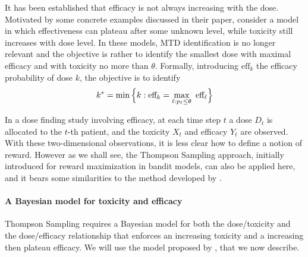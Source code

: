 It has been established that efficacy is not always increasing with the dose. Motivated by some concrete examples discussed in their paper, \cite{MKR17} consider a model in which effectiveness can plateau after some unknown level, while toxicity still increases with dose level. In these models, MTD identification is no longer relevant and the objective is rather to identify the smallest dose with maximal efficacy and with toxicity no more than $\theta$. Formally, introducing $\text{eff}_k$ the efficacy probability of dose $k$, the objective is to identify
\[k^* = \min\Big\{ k : \eff_k = \max_{\ell : p_\ell \leq \theta} \ \text{eff}_\ell\Big\}  \]

In a dose finding study involving efficacy, at each time step $t$ a dose $D_t$ is allocated to the $t$-th patient, and the toxicity $X_t$ and efficacy $Y_t$ are observed. With these two-dimensional observations, it is less clear how to define a notion of reward. However as we shall see, the Thompson Sampling approach, initially introduced for reward maximization in bandit models, can also be applied here, and it bears some similarities to the method developed by \cite{MKR17}.

\paragraph{A Bayesian model for toxicity and efficacy} Thompson Sampling requires a Bayesian model for both the dose/toxicity and the dose/efficacy relationship that enforces an increasing toxicity and a increasing then plateau efficacy. We will use the model proposed by \cite{MKR17}, that we now describe.

